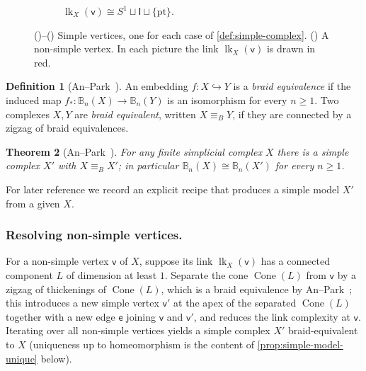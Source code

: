 \documentclass[reqno]{amsart}
\newtheorem{theorem}{Theorem}[section]
\theoremstyle{definition}
\newtheorem{definition}[theorem]{Definition}
\newcommand\sfe{\mathsf{e}}
\newcommand\sfv{\mathsf{v}}
\newcommand{\BG}{\mathbb{B}}
\DeclareMathOperator{\lk}{lk}
\numberwithin{equation}{section}
\begin{document}
\begin{figure}[ht]
\begin{subfigure}[b]{0.24\textwidth}
\caption{\(\lk_X(\sfv)\cong S^1\sqcup\mathsf{I}\sqcup\{\mathrm{pt}\}\).}
\label{fig:non-simple-vertex}
\end{subfigure}
\caption{()--()
Simple vertices, one for each case of
\cref{def:simple-complex}.
() 
A non-simple vertex.
In each picture the link
\(\lk_X(\sfv)\) is drawn in red.}
\label{fig:simple-vertices}
\end{figure}

\begin{definition}[{An--Park~\cite[Def.~2.8]{AnPark2017}}]
\label{def:braid-equiv}
An embedding \(f\colon X\hookrightarrow Y\) is a \emph{braid
equivalence} if the induced map
\(f_\ast\colon\BG_n(X)\to\BG_n(Y)\) is an isomorphism for every
\(n\geq 1\). Two complexes \(X, Y\) are \emph{braid equivalent},
written \(X\equiv_B Y\), if they are connected by a zigzag of braid
equivalences.
\end{definition}

\begin{theorem}[{An--Park~\cite[Thm.~1.1]{AnPark2017}}]
\label{thm:an-park}
For any finite simplicial complex \(X\) there is a simple complex
\(X'\) with \(X\equiv_B X'\); in
particular \(\BG_n(X)\cong \BG_n(X')\) for every \(n\geq 1\).
\end{theorem}

For later reference we record an explicit recipe that produces a
simple model \(X'\) from a given \(X\).

\subsubsection{Resolving non-simple vertices.}
For a non-simple vertex \(\sfv\) of \(X\), suppose its link
\(\lk_X(\sfv)\) has a connected component \(L\) of dimension at
least \(1\). Separate the cone \(\operatorname{Cone}(L)\) from \(\sfv\)
by a zigzag of thickenings of \(\operatorname{Cone}(L)\), which is
a braid equivalence by
An--Park~\cite[Proposition~3.11]{AnPark2017}; this introduces a
new simple vertex \(\sfv'\) at the apex of the separated
\(\operatorname{Cone}(L)\) together with a new edge \(\sfe\)
joining \(\sfv\) and \(\sfv'\), and reduces the link complexity at \(\sfv\).
Iterating over all non-simple vertices yields a simple complex
\(X'\) braid-equivalent to \(X\) (uniqueness up to
homeomorphism is the content of
\cref{prop:simple-model-unique} below).
\end{document}
